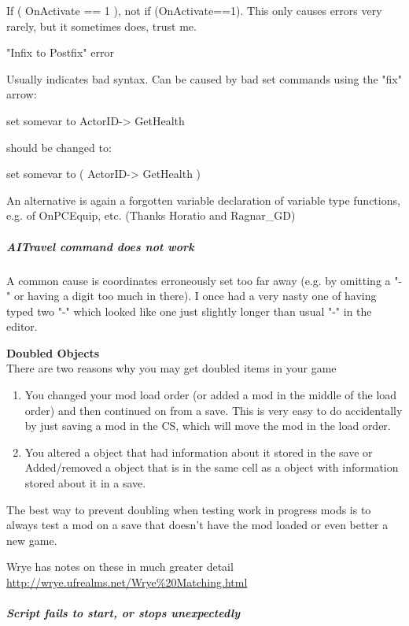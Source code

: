 If ( OnActivate == 1 ), not if (OnActivate==1). This only causes errors
very rarely, but it sometimes does, trust me.

"Infix to Postfix" error

Usually indicates bad syntax. Can be caused by bad set commands using
the "fix" arrow:

set somevar to ActorID-> GetHealth

should be changed to:

set somevar to ( ActorID-> GetHealth )

An alternative is again a forgotten variable declaration of variable
type functions, e.g. of OnPCEquip, etc. (Thanks Horatio and Ragnar\_GD)

\hypertarget{aitravel-command-does-not-work}{%
\subparagraph{AITravel command does not
work}\label{aitravel-command-does-not-work}}

A common cause is coordinates erroneously set too far away (e.g. by
omitting a "-" or having a digit too much in there). I once had a very
nasty one of having typed two "-" which looked like one just slightly
longer than usual "-" in the editor.

\textbf{Doubled Objects\\
}There are two reasons why you may get doubled items in your game

\begin{enumerate}
\def\labelenumi{\arabic{enumi}.}
\item
  You changed your mod load order (or added a mod in the middle of the
  load order) and then continued on from a save. This is very easy to do
  accidentally by just saving a mod in the CS, which will move the mod
  in the load order.
\item
  You altered a object that had information about it stored in the save
  or Added/removed a object that is in the same cell as a object with
  information stored about it in a save.
\end{enumerate}

The best way to prevent doubling when testing work in progress mods is
to always test a mod on a save that doesn't have the mod loaded or even
better a new game.

Wrye has notes on these in much greater detail
\url{http://wrye.ufrealms.net/Wrye\%20Matching.html}

\hypertarget{script-fails-to-start-or-stops-unexpectedly}{%
\subparagraph{Script fails to start, or stops
unexpectedly}\label{script-fails-to-start-or-stops-unexpectedly}}

